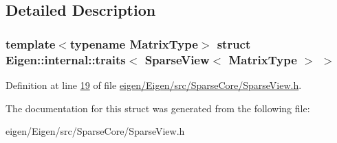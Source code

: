 \subsection{Detailed Description}
\subsubsection*{template$<$typename Matrix\+Type$>$\newline
struct Eigen\+::internal\+::traits$<$ Sparse\+View$<$ Matrix\+Type $>$ $>$}



Definition at line \hyperlink{eigen_2_eigen_2src_2_sparse_core_2_sparse_view_8h_source_l00019}{19} of file \hyperlink{eigen_2_eigen_2src_2_sparse_core_2_sparse_view_8h_source}{eigen/\+Eigen/src/\+Sparse\+Core/\+Sparse\+View.\+h}.



The documentation for this struct was generated from the following file\+:\begin{DoxyCompactItemize}
\item 
eigen/\+Eigen/src/\+Sparse\+Core/\+Sparse\+View.\+h\end{DoxyCompactItemize}
